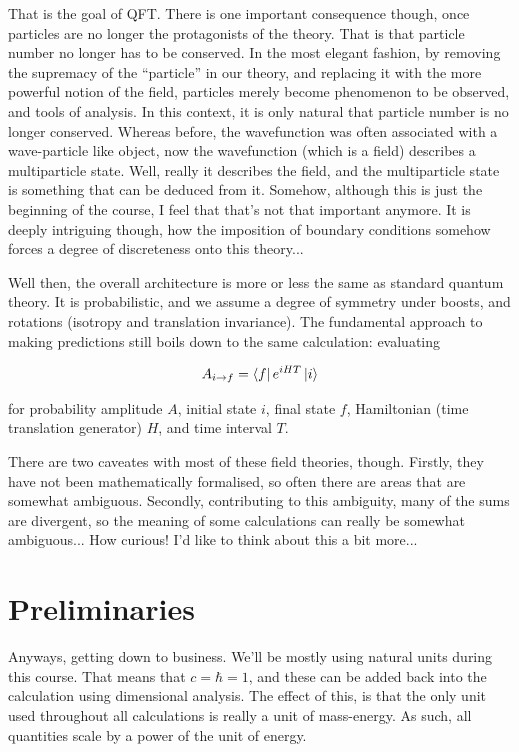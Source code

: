 \documentclass{article}
\theoremstyle{definition}
\begin{document}
That is the goal of QFT. There is one important consequence though, once
particles are no longer the protagonists of the theory. That is that particle
number no longer has to be conserved. In the most elegant fashion, by removing
the supremacy of the ``particle'' in our theory, and replacing it with the more
powerful notion of the field, particles merely become phenomenon to be observed,
and tools of analysis. In this context, it is only natural that particle number
is no longer conserved. Whereas before, the wavefunction was often associated
with a wave-particle like object, now the wavefunction (which is a field)
describes a multiparticle state. Well, really it describes the field, and the
multiparticle state is something that can be deduced from it. Somehow, although
this is just the beginning of the course, I feel that that's not that important
anymore. It is deeply intriguing though, how the imposition of boundary
conditions somehow forces a degree of discreteness onto this theory...

Well then, the overall architecture is more or less the same as standard quantum
theory. It is probabilistic, and we assume a degree of symmetry under
boosts, and rotations (isotropy and translation invariance). The fundamental
approach to making predictions still boils down to the same calculation:
evaluating

$$ A_{i \to f} = \bra{f} e^{i H T} \ket{i} $$

for probability amplitude $A$, initial state $i$, final state $f$, Hamiltonian
(time translation generator) $H$, and time interval $T$.

There are two caveates with most of these field theories, though. Firstly, they
have not been mathematically formalised, so often there are areas that are
somewhat ambiguous. Secondly, contributing to this ambiguity, many of the sums
are divergent, so the meaning of some calculations can really be somewhat
ambiguous... How curious! I'd like to think about this a bit more...

\section{Preliminaries}

Anyways, getting down to business. We'll be mostly using natural units during
this course. That means that $c = \hbar = 1$, and these can be added back into
the calculation using dimensional analysis. The effect of this, is that the only
unit used throughout all calculations is really a unit of mass-energy. As such,
all quantities scale by a power of the unit of energy. 
\end{document}
